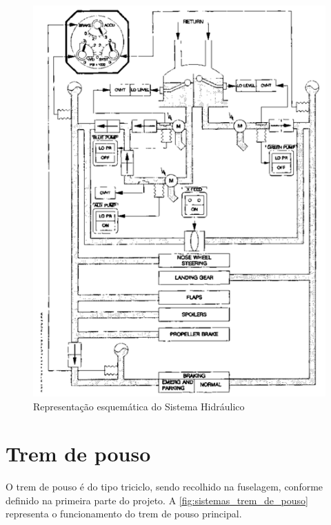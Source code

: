 \begin{figure}
\centering
\includegraphics[width=\textwidth]{images/parte3/sistemas_hidraulico.png}
\caption{Representação esquemática do Sistema Hidráulico}
\label{fig:sistemas_hidraulico}
\end{figure}


\section{Trem de pouso}

O trem de pouso é do tipo triciclo, sendo recolhido na fuselagem, conforme definido na primeira parte do projeto.
A \autoref{fig:sistemas_trem_de_pouso} representa o funcionamento do trem de pouso principal.

